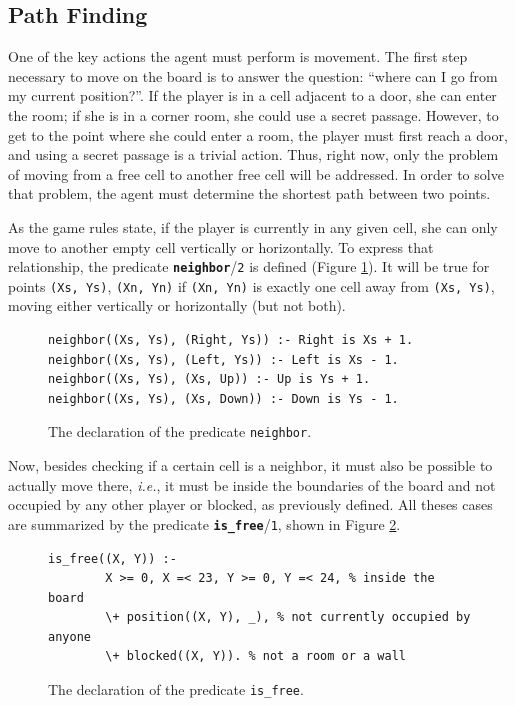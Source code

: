 \documentclass[12pt,a4paper]{article}
\newcommand{\varname}[1]{\texttt{#1}}
\newcommand{\varnamebf}[1]{\textbf{\texttt{#1}}}
\newcommand{\predprot}[2]{{\color{MidnightBlue}\varnamebf{#1}}/{\color{Mulberry}\varname{#2}}}
\newcommand{\predname}[1]{{\color{MidnightBlue}\varname{#1}}}
\begin{document}
\subsection{Path Finding}

One of the key actions the agent must perform is movement. The first step necessary to move on the board is to answer the question: ``where can I go from my current position?''. If the player is in a cell adjacent to a door, she can enter the room; if she is in a corner room, she could use a secret passage. However, to get to the point where she could enter a room, the player must first reach a door, and using a secret passage is a trivial action. Thus, right now, only the problem of moving from a free cell to another free cell will be addressed. In order to solve that problem, the agent must determine the shortest path between two points.

As the game rules state, if the player is currently in any given cell, she can only move to another empty cell vertically or horizontally. To express that relationship, the predicate \predprot{neighbor}{2} is defined (Figure \ref{fig:neighbor}). It will be true for points \varname{(Xs, Ys)}, \varname{(Xn, Yn)} if \varname{(Xn, Yn)} is exactly one cell away from \varname{(Xs, Ys)}, moving either vertically or horizontally (but not both).

\begin{figure}[H]
	\centering
\begin{lstlisting}[style=Prolog-pygsty]
%% neighbor((Xs, Ys), (Xn, Yn)) - <Xn, Yn> is neighbor of <Xs, Ys>.
neighbor((Xs, Ys), (Right, Ys)) :- Right is Xs + 1.
neighbor((Xs, Ys), (Left, Ys)) :- Left is Xs - 1.
neighbor((Xs, Ys), (Xs, Up)) :- Up is Ys + 1.
neighbor((Xs, Ys), (Xs, Down)) :- Down is Ys - 1.
\end{lstlisting}
	\caption{The declaration of the predicate \predname{neighbor}.} 
	\label{fig:neighbor}
\end{figure}

Now, besides checking if a certain cell is a neighbor, it must also be possible to actually move there, \textit{i.e.}, it must be inside the boundaries of the board and not occupied by any other player or blocked, as previously defined. All theses cases are summarized by the predicate \predprot{is\_free}{1}, shown in Figure \ref{fig:is-free}.

\begin{figure}[H]
	\centering
\begin{lstlisting}[style=Prolog-pygsty]
%% is_free((X, Y)) - the position <X, Y> can bee occupied by a character.
is_free((X, Y)) :-
		X >= 0, X =< 23, Y >= 0, Y =< 24, % inside the board
		\+ position((X, Y), _), % not currently occupied by anyone
		\+ blocked((X, Y)). % not a room or a wall
\end{lstlisting}
	\caption{The declaration of the predicate \predname{is\_free}.} 
	\label{fig:is-free}
\end{figure}
\end{document}

